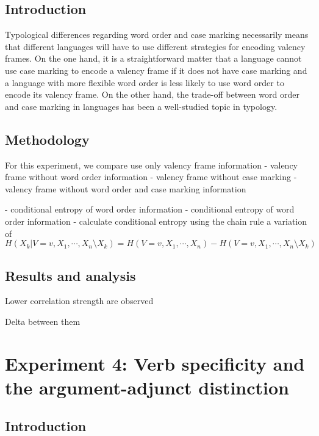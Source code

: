 \subsection{Introduction}

Typological differences regarding word order and case marking necessarily means that different languages will have to use different strategies for encoding valency frames. On the one hand, it is a straightforward matter that a language cannot use case marking to encode a valency frame if it does not have case marking and a language with more flexible word order is less likely to use word order to encode its valency frame. On the other hand, the trade-off between word order and case marking in languages has been a well-studied topic in typology.

\subsection{Methodology}

For this experiment, we compare use only valency frame information  
- valency frame without word order information
- valency frame without case marking
- valency frame without word order and case marking information

- conditional entropy of word order information 
-  conditional entropy of word order information 
- calculate conditional entropy using the chain rule
a variation of
$$H(X_{k} | V = v, X_{1},\cdots,X_{n} \setminus X_{k}) = H( V = v, X_{1},\cdots,X_{n}) - H( V = v, X_{1},\cdots,X_{n}\setminus X_{k})$$

\subsection{Results and analysis}


Lower correlation strength are observed


Delta between them 

\section{Experiment 4: Verb specificity and the argument-adjunct distinction}\label{sec:exp4-verb-specificity}

\subsection{Introduction}

